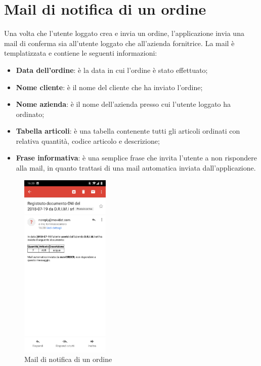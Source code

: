 \section{Mail di notifica di un ordine}

Una volta che l'utente loggato crea e invia un ordine, l'applicazione invia una mail di conferma sia all'utente loggato che all'azienda fornitrice. La mail è templatizzata e contiene le seguenti informazioni:
\begin{itemize}
	\item \textbf{Data dell'ordine}: è la data in cui l'ordine è stato effettuato;
	\item \textbf{Nome cliente}: è il nome del cliente che ha inviato l'ordine;
	\item \textbf{Nome azienda}: è il nome dell'azienda presso cui l'utente loggato ha ordinato;
	\item \textbf{Tabella articoli}: è una tabella contenente tutti gli articoli ordinati con relativa quantità, codice articolo e descrizione;
	\item \textbf{Frase informativa}: è una semplice frase che invita l'utente a non rispondere alla mail, in quanto trattasi di una mail automatica inviata dall'applicazione.
\end{itemize}

\begin{figure}[h]
	\centering
	\includegraphics[width=.3\textwidth,height=9cm]{./img/templatemail.jpg}
	\caption{Mail di notifica di un ordine}
\end{figure}